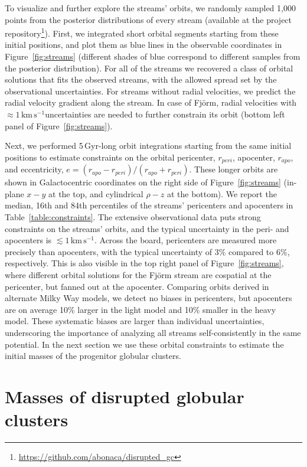 \documentclass[twocolumn]{aastex63}
\newcommand{\kms}{\ensuremath{\textrm{km}\,\textrm{s}^{-1}}}
\begin{document}
To visualize and further explore the streams' orbits, we randomly sampled 1,000 points from the posterior distributions of every stream (available at the project repository\footnote{\url{https://github.com/abonaca/disrupted_gc}}).
First, we integrated short orbital segments starting from these initial positions, and plot them as blue lines in the observable coordinates in Figure~\ref{fig:streams} (different shades of blue correspond to different samples from the posterior distribution).
For all of the streams we recovered a class of orbital solutions that fits the observed streams, with the allowed spread set by the observational uncertainties.
For streams without radial velocities, we predict the radial velocity gradient along the stream.
In case of Fj\" orm, radial velocities with $\approx1$\,\kms uncertainties are needed to further constrain its orbit (bottom left panel of Figure~\ref{fig:streams}).

Next, we performed 5\,Gyr-long orbit integrations starting from the same initial positions to estimate constraints on the orbital pericenter, $r_{peri}$, apocenter, $r_{apo}$, and eccentricity, $e=(r_{apo} - r_{peri})/(r_{apo} + r_{peri})$.
These longer orbits are shown in Galactocentric coordinates on the right side of Figure~\ref{fig:streams} (in-plane $x-y$ at the top, and cylindrical $\rho-z$ at the bottom).
We report the median, 16th and 84th percentiles of the streams' pericenters and apocenters in Table~\ref{table:constraints}.
The extensive observational data puts strong constraints on the streams' orbits, and the typical uncertainty in the peri- and apocenters is $\lesssim1\,\kms$.
Across the board, pericenters are measured more precisely than apocenters, with the typical uncertainty of 3\% compared to 6\%, respectively.
This is also visible in the top right panel of Figure~\ref{fig:streams}, where different orbital solutions for the  Fj\" orm stream are cospatial at the pericenter, but fanned out at the apocenter.
Comparing orbits derived in alternate Milky Way models, we detect no biases in pericenters, but apocenters are on average 10\% larger in the light model and 10\% smaller in the heavy model.
These systematic biases are larger than individual uncertainties, underscoring the importance of analyzing all streams self-consistently in the same potential.
In the next section we use these orbital constraints to estimate the initial masses of the progenitor globular clusters.

\section{Masses of disrupted globular clusters}
\label{sec:disrupted}
\end{document}
